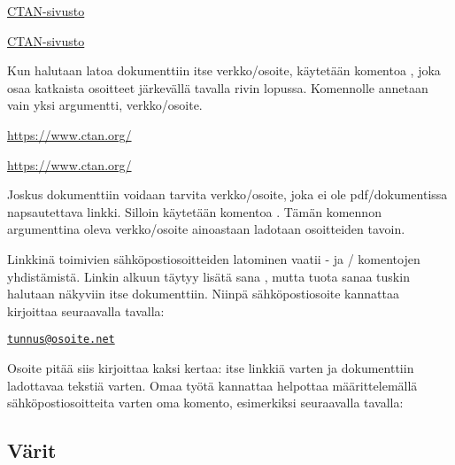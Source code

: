 \begin{koodilohkosis}
\href{https://www.ctan.org/}{CTAN-sivusto}
\end{koodilohkosis}

\begin{tulossis}
  \href{https://www.ctan.org/}{CTAN-sivusto}
\end{tulossis}

\noindent
Kun halutaan latoa dokumenttiin itse verkko\-/osoite, käytetään komentoa
,  joka osaa katkaista osoitteet
järkevällä tavalla rivin lopussa. Komennolle annetaan vain yksi
argumentti, verkko\-/osoite.

\begin{koodilohkosis}
\url{https://www.ctan.org/}
\end{koodilohkosis}

\begin{tulossis}
  \url{https://www.ctan.org/}
\end{tulossis}

\noindent
Joskus dokumenttiin voidaan tarvita verkko\-/osoite, joka ei ole
pdf\-/dokumentissa napsautettava linkki. Silloin käytetään komentoa
. Tämän komennon argumenttina oleva verkko\-/osoite
ainoastaan ladotaan osoitteiden tavoin.

Linkkinä toimivien sähköpostiosoitteiden latominen vaatii
- ja \-/ komentojen yhdistämistä.
Linkin alkuun täytyy lisätä sana , mutta tuota sanaa
tuskin halutaan näkyviin itse dokumenttiin. Niinpä sähköpostiosoite
kannattaa kirjoittaa seuraavalla tavalla:

\begin{koodilohkosis}
\href{mailto:tunnus@osoite.net}{\nolinkurl{tunnus@osoite.net}}
\end{koodilohkosis}

\noindent
Osoite pitää siis kirjoittaa kaksi kertaa: itse linkkiä varten ja
dokumenttiin ladottavaa tekstiä varten. Omaa työtä kannattaa helpottaa
määrittelemällä sähköpostiosoitteita varten oma komento, esimerkiksi
seuraavalla tavalla:

\begin{koodilohkosis}
\newcommand{\sposti}[1]{\href{mailto:#1}{\nolinkurl{#1}}}
\end{koodilohkosis}

\subsection{Värit}
\label{luku/korostus-värit}

